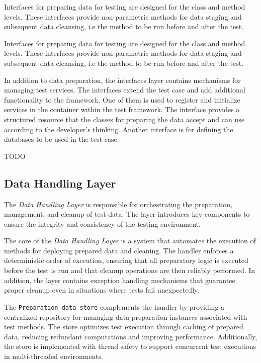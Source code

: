 Interfaces for preparing data for testing are designed for the class and method levels. These interfaces provide non-parametric methods for data staging and subsequent data cleansing, i.e the method to be run before and after the test.

Interfaces for preparing data for testing are designed for the class and method levels. These interfaces provide non-parametric methods for data staging and subsequent data cleansing, i.e the method to be run before and after the test.

In addition to data preparation, the interfaces layer contains mechanisms for managing test services. The interfaces extend the test case and add additional functionality to the framework.   One of them is used to register and initialize services in the container within the test framework. 
The interface provides a structured resource that the classes for preparing the data accept and can use according to the developer's thinking.
Another interface is for defining the databases to be used in the test case. 

TODO


\subsection{Data Handling Layer}


The \textit{Data Handling Layer} is responsible for orchestrating the preparation, management, and cleanup of test data. The layer introduces key components to ensure the integrity and consistency of the testing environment.

The core of the \textit{Data Handling Layer} is a system that automates the execution of methods for deploying prepared data and cleaning. The handler enforces a deterministic order of execution, ensuring that all preparatory logic is executed before the test is run and that cleanup operations are then reliably performed. In addition, the layer contains exception handling mechanisms that guarantee proper cleanup even in situations where tests fail unexpectedly.

The \texttt{Preparation data store} complements the handler by providing a centralized repository for managing data preparation instances associated with test methods. The store optimizes test execution through caching of prepared data, reducing redundant computations and improving performance. Additionally, the store is implemented with thread safety to support concurrent test executions in multi-threaded environments.

